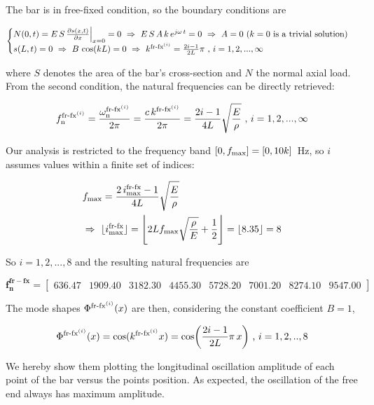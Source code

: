 \documentclass[a4paper,12pt,oneside]{article}
\begin{document}
The bar is in free-fixed condition, so the boundary conditions are

\[ \begin{cases}
	N(0,t) = E \, S \, \frac{\partial s(x,t)}{\partial x}\Big|_{x=0} = 0
		~ \Rightarrow ~ E \, S \, A \, k \, e^{j \omega \, t} = 0
		~ \Rightarrow ~ A = 0 ~ \text{($ k = 0 $ is a trivial solution)} \\
	s(L,t) = 0 ~ \Rightarrow ~ B \, \cos(kL) = 0 ~ \Rightarrow ~
		k^{\textup{fr-fx}^{(i)}} = \frac{2i - 1}{2L} \pi
		~ \text{,} ~ i = 1,2,...,\infty
\end{cases} \]

where $ S $ denotes the area of the bar's cross-section and $ N $ the normal axial load. From the second condition, the natural frequencies can be directly retrieved:

\[
	f_\textup{n}^{\textup{fr-fx}^{(i)}} =
		\frac{\omega_\textup{n}^{\textup{fr-fx}^{(i)}}}{2 \pi} =
		\frac{c \, k^{\textup{fr-fx}^{(i)}}}{2 \pi} =
		\frac{2i - 1}{4L} \sqrt{\frac{E}{\rho}} ~ \text{,} ~ i = 1,2,...,\infty
\]

Our analysis is restricted to the frequency band $ [0, f_\textup{max}] = [0, 10k] \, $ Hz, so $ i $ assumes values within a finite set of indices:

\[ \begin{split}
	& f_\textup{max} = \frac{2 \, i^\textup{fr-fx}_\textup{max} - 1}{4L}
		\sqrt{\frac{E}{\rho}} \\
	& \Rightarrow ~ \lfloor i^\textup{fr-fx}_\textup{max} \rfloor =
		\Biggl\lfloor 2 L f_\textup{max}
		\sqrt{\frac{\rho}{E}} + \frac{1}{2} \Biggr\rfloor = \lfloor 8.35 \rfloor = 8
\end{split} \]

So $ i = 1,2,...,8 $ and the resulting natural frequencies are

\[
	\mathbf{f_n^{fr-fx}} =	\begin{bmatrix}
														636.47		& 1909.40	& 3182.30	& 4455.30
														& 5728.20	& 7001.20	& 8274.10	& 9547.00
													\end{bmatrix}
\]

The mode shapes $ \Phi^{\textup{fr-fx}^{(i)}}(x) $ are then, considering the constant coefficient $ B = 1 $,

\[
	\Phi^{\textup{fr-fx}^{(i)}}(x) = \cos(k^{\textup{fr-fx}^{(i)}} x) =
		\cos\biggl(\frac{2i - 1}{2L} \pi \, x\biggr) ~ \text{,} ~ i = 1,2,..,8
\]

We hereby show them plotting the longitudinal oscillation amplitude of each point of the bar versus the points position. As expected, the oscillation of the free end always has maximum amplitude.
\end{document}
